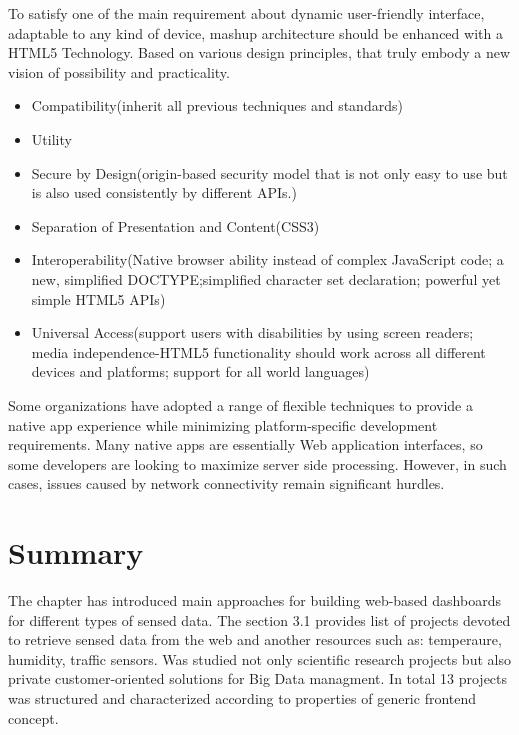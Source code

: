 To satisfy one of the main requirement about dynamic user-friendly interface, adaptable to any kind of device, mashup architecture should be enhanced with a HTML5 Technology. Based on various design principles, that truly embody a new vision of possibility and practicality\cite{hickson2011html5}.
\begin{itemize}
\item Compatibility(inherit all previous techniques and standards)
\item Utility
\item Secure by Design(origin-based security model that is not only easy to use but is also used consistently by different APIs.)
\item Separation of Presentation and Content(CSS3)
\item Interoperability(Native browser ability instead of complex JavaScript code; a new, simplified DOCTYPE;simplified character set declaration; powerful yet simple HTML5 APIs)
\item Universal Access(support users with disabilities by using screen readers; media independence-HTML5 functionality should work across all different devices and platforms; support for all world languages)
\end{itemize}

Some organizations have adopted a range of flexible techniques to provide a native app experience while minimizing platform-specific development requirements. Many native apps are essentially Web application interfaces, so some developers are looking to maximize server side processing. However, in such cases, issues caused by network connectivity remain significant hurdles.


\section{Summary}
The chapter has introduced main approaches for building web-based dashboards for different types of sensed data. The section 3.1 provides list of projects devoted to retrieve sensed data from the web and another resources such as: temperaure, humidity, traffic sensors. Was studied not only scientific research projects but also private customer-oriented solutions for Big Data managment. In total 13 projects was structured and characterized according to properties of generic frontend concept.

